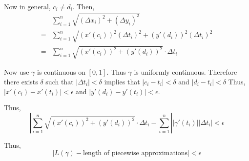 Now in general, $c_i\neq d_i$.  Then,
\begin{align*}
& \sum\limits_{i=1}^n\sqrt{(\Delta x_i)^2+(\Delta y_i)^2}\\
= & \sum\limits_{i=1}^n\sqrt{(x'(c_i))^2(\Delta t_i)^2+(y'(d_i))^2(\Delta t_i)^2}\\
= & \sum\limits_{i=1}^n\sqrt{(x'(c_i))^2+(y'(d_i))^2}\cdot\Delta t_i
\end{align*}

Now use $\gamma$ is continuous on $[0,1]$.  Thus $\gamma$ is uniformly continuous.
Therefore there exists $\delta$ such that $|\Delta t_i|< \delta$ implies that $|c_i-t_i|<\delta$ and $|d_i-t_i|<\delta$
Thus, $|x'(c_i)-x'(t_i)|<\epsilon$ and $|y'(d_i)-y'(t_i)|<\epsilon$.

Thus, 
$$|\sum\limits_{i=1}^n\sqrt{(x'(c_i))^2+(y'(d_i))^2}\cdot\Delta t_i-\sum\limits_{i=1}^n ||\gamma'(t_i)||\Delta t_i| <\epsilon$$

Thus, 
$$|L(\gamma)-\text{length of piecewise approximations}|<\epsilon$$


